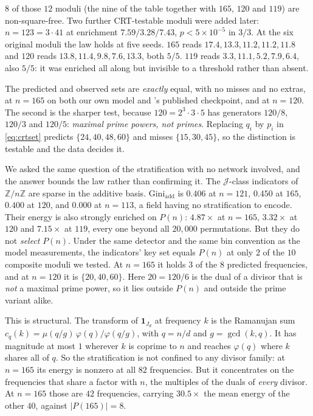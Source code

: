 $8$ of those $12$ moduli (the nine of the table together with $165$, $120$ and $119$) are
non-square-free. Two further CRT-testable moduli were added
later: $n = 123 = 3 \cdot 41$ at enrichment $7.59 / 3.28 / 7.43$, $p < 5 \times 10^{-5}$ in $3/3$. At the
six original moduli the law holds at five seeds. $165$ reads $17.4, 13.3, 11.2, 11.2, 11.8$
and $120$ reads $13.8, 11.4, 9.8, 7.6, 13.3$, both $5/5$. $119$ reads
$3.3, 11.1, 5.2, 7.9, 6.4$, also $5/5$: it was enriched all along but invisible to a threshold
rather than absent.

The predicted and observed sets are \emph{exactly} equal, with no misses and no extras, at
$n = 165$ on both our own model and \citet{chen2026multiplication}'s published checkpoint, and
at $n = 120$. The second is the sharper test, because $120 = 2^{3} \cdot 3 \cdot 5$ has
generators $120/8$, $120/3$ and $120/5$: \emph{maximal prime powers, not primes}. Replacing
$q_{i}$ by $p_{i}$ in \eqref{eq:crtset} predicts $\{24, 40, 48, 60\}$ and misses
$\{15, 30, 45\}$, so the distinction is testable and the data decides it.

We asked the same question of the stratification with no network involved, and the answer
bounds the law rather than confirming it. The $\mathcal{J}$-class indicators of
$\mathbb{Z}/n\mathbb{Z}$ are sparse in the additive basis.
$\mathrm{Gini}_{\text{add}}$ is $0.406$ at $n = 121$, $0.450$ at $165$, $0.400$ at $120$, and
$\mathbf{0.000}$ at $n = 113$, a field having no stratification to encode. Their energy is
also strongly enriched on $P(n)$: $4.87\times$ at $n = 165$, $3.32\times$ at $120$ and
$7.15\times$ at $119$, every one beyond all $20{,}000$ permutations. But they do not
\emph{select} $P(n)$. Under the same detector and the same bin convention as the model
measurements, the indicators' key set equals $P(n)$ at only $2$ of the $10$ composite moduli
we tested. At $n = 165$ it holds $3$ of the $8$ predicted frequencies, and at $n = 120$ it is
$\{20, 40, 60\}$. Here $20 = 120/6$ is the dual of a divisor that is \emph{not} a maximal
prime power, so it lies outside $P(n)$ and outside the prime variant alike.

This is structural. The transform of $\mathbf{1}_{J_{d}}$ at frequency $k$ is the Ramanujan
sum $c_{q}(k) = \mu(q/g)\,\varphi(q)/\varphi(q/g)$, with $q = n/d$ and $g = \gcd(k, q)$. It
has magnitude at most $1$ wherever $k$ is coprime to $n$ and reaches $\varphi(q)$ where $k$
shares all of $q$. So the stratification is not confined to any divisor family: at
$n = 165$ its energy is nonzero at all $82$ frequencies. But it concentrates on the
frequencies that share a factor with $n$, the multiples of the duals of \emph{every}
divisor. At $n = 165$ those are $42$ frequencies, carrying $30.5\times$ the mean energy of
the other $40$, against $|P(165)| = 8$.

